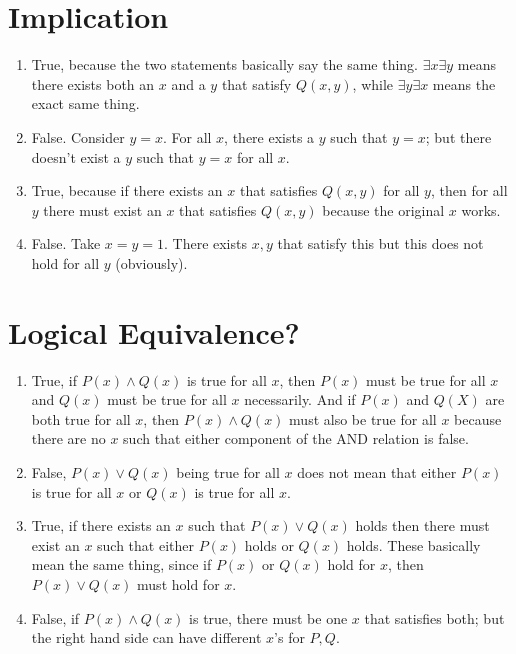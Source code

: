 \documentclass{article}
\begin{document}
\section{Implication}
\begin{enumerate}[label=\alph*.]
	\item True, because the two statements basically say
	the same thing. $\exists x \exists y$ means there exists 
	both an $x$ and a $y$ that satisfy $Q(x,y)$, while 
	$\exists y \exists x$ means the exact same thing.
	\item False. Consider $y=x$. For all $x$, there exists a $y$
	such that $y = x$; but there doesn't exist a $y$ such that 
	$y = x$ for all $x$. 
	\item True, because if there exists an $x$ that 
	satisfies $Q(x,y)$ for all $y$, then for all $y$ there must exist an 
	$x$ that satisfies $Q(x, y)$ because the original $x$ works.
	\item False. Take $x=y=1$. There exists $x,y$ that satisfy this 
	but this does not hold for all $y$ (obviously). 
\end{enumerate}

\section{Logical Equivalence?}
\begin{enumerate}[label=\alph*.]
	\item True, if $P(x) \land Q(x)$ is true for all $x$, then $P(x)$ must 
	be true for all $x$ and $Q(x)$ must be true for all $x$ necessarily. And if 
	$P(x)$ and $Q(X)$ are both true for all $x$, then $P(x) \land Q(x)$ must also 
	be true for all $x$ because there are no $x$ such that either component of the 
	AND relation is false.
	\item False, $P(x) \lor Q(x)$ being true for all $x$ does not mean that 
	either $P(x)$ is true for all $x$ or $Q(x)$ is true for all $x$.
	\item True, if there exists an $x$ such that $P(x) \lor Q(x)$ holds 
	then there must exist an $x$ such that either $P(x)$ holds or $Q(x)$ 
	holds. These basically mean the same thing, since if $P(x)$ or 
	$Q(x)$ hold for $x$, then $P(x) \lor Q(x)$ must hold for $x$.
	\item False, if $P(x) \land Q(x)$ is true, there must be one $x$ 
	that satisfies both; but the right hand side can have different 
	$x$'s for $P, Q$.
\end{enumerate}
\end{document}
